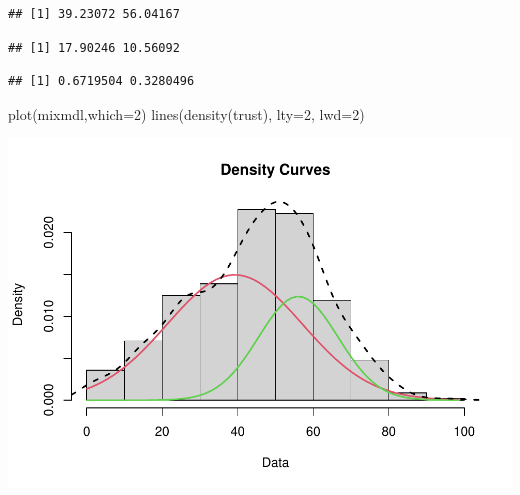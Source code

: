 \documentclass[
]{book}
\newenvironment{Shaded}{\begin{snugshade}}{\end{snugshade}}
\newcommand{\AttributeTok}[1]{\textcolor[rgb]{0.77,0.63,0.00}{#1}}
\newcommand{\DecValTok}[1]{\textcolor[rgb]{0.00,0.00,0.81}{#1}}
\newcommand{\FunctionTok}[1]{\textcolor[rgb]{0.00,0.00,0.00}{#1}}
\newcommand{\NormalTok}[1]{#1}
\newcommand{\SpecialCharTok}[1]{\textcolor[rgb]{0.00,0.00,0.00}{#1}}
\begin{document}
\begin{Shaded}
\end{Shaded}

\begin{verbatim}
## [1] 39.23072 56.04167
\end{verbatim}

\begin{Shaded}
\end{Shaded}

\begin{verbatim}
## [1] 17.90246 10.56092
\end{verbatim}

\begin{Shaded}
\end{Shaded}

\begin{verbatim}
## [1] 0.6719504 0.3280496
\end{verbatim}

\begin{Shaded}
\begin{Highlighting}[]
\FunctionTok{plot}\NormalTok{(mixmdl,}\AttributeTok{which=}\DecValTok{2}\NormalTok{)}
\FunctionTok{lines}\NormalTok{(}\FunctionTok{density}\NormalTok{(trust), }\AttributeTok{lty=}\DecValTok{2}\NormalTok{, }\AttributeTok{lwd=}\DecValTok{2}\NormalTok{)}
\end{Highlighting}
\end{Shaded}

\includegraphics{bookdown-demo_files/figure-latex/307-2.pdf}
\end{document}
